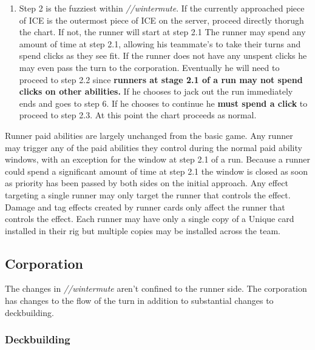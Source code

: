 \documentclass[titlepage]{article}
\begin{document}
\begin{itemize}
\begin{enumerate}
						\item Step 2 is the fuzziest within \emph{//wintermute}. If the currently approached piece of ICE is the outermost piece of ICE on the server, proceed directly thorugh the chart. If not, the runner will start at step 2.1 The runner may spend any amount of time at step 2.1, allowing his teammate's to take their turns and spend clicks as they see fit. If the runner does not have any unspent clicks he may even pass the turn to the corporation. Eventually he will need to proceed to step 2.2 since \textbf{runners at stage 2.1 of a run may not spend clicks on other abilities.} If he chooses to jack out the run immediately ends and goes to step 6. If he chooses to continue he \textbf{must spend a click} to proceed to step 2.3. At this point the chart proceeds as normal.

					\end{enumerate}

			\end{itemize}

			Runner paid abilities are largely unchanged from the basic game. Any runner may trigger any of the paid abilities they control during the normal paid ability windows, with an exception for the window at step 2.1 of a run. Because a runner could spend a significant amount of time at step 2.1 the window is closed as soon as priority has been passed by both sides on the initial approach. Any effect targeting a single runner may only target the runner that controls the effect. Damage and tag effects created by runner cards only affect the runner that controls the effect. Each runner may have only a single copy of a Unique card installed in their rig but multiple copies may be installed across the team.

	\subsection{Corporation}

		The changes in \emph{//wintermute} aren't confined to the runner side. The corporation has changes to the flow of the turn in addition to substantial changes to deckbuilding.

		\subsubsection{Deckbuilding}
\end{document}
